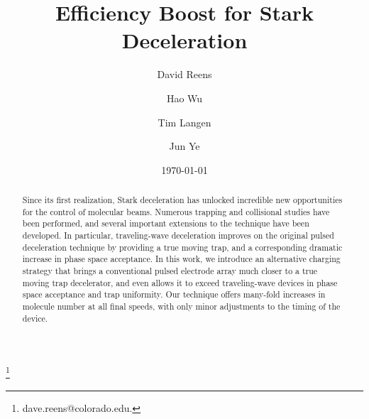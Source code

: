 \documentclass[%
 reprint,
 amsmath,amssymb,
 aps,
prl,
]{revtex4-1}
\begin{document}
\title{Efficiency Boost for Stark Deceleration}%

\author{David Reens}
\thanks{dave.reens@colorado.edu.}

\author{Hao Wu}

\author{Tim Langen}%

\author{Jun Ye}


\date{\today}



\begin{abstract}
Since its first realization, Stark deceleration has unlocked incredible new opportunities for the control of molecular beams. 
Numerous trapping and collisional studies have been performed, and several important extensions to the technique have been developed. 
In particular, traveling-wave deceleration improves on the original pulsed deceleration technique by providing a true moving trap, and a corresponding dramatic increase in phase space acceptance.
In this work, we introduce an alternative charging strategy that brings a conventional pulsed electrode array much closer to a true moving trap decelerator, and even allows it to exceed traveling-wave devices in phase space acceptance and trap uniformity.
Our technique offers many-fold increases in molecule number at all final speeds, with only minor adjustments to the timing of the device.
\end{abstract}

\maketitle


\end{document}
